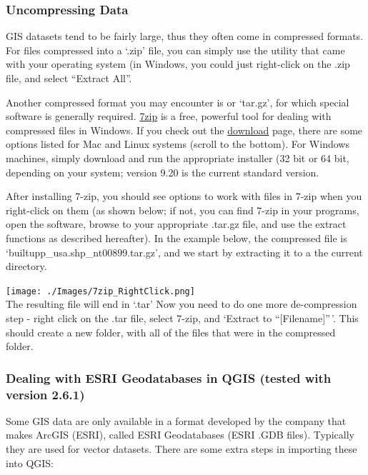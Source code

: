 \documentclass[12pt,]{article}
\begin{document}
\subsubsection{Uncompressing Data}\label{uncompressing-data}

GIS datasets tend to be fairly large, thus they often come in compressed
formats. For files compressed into a `.zip' file, you can simply use the
utility that came with your operating system (in Windows, you could just
right-click on the .zip file, and select ``Extract All''.

Another compressed format you may encounter is or `tar.gz', for which
special software is generally required.
\href{http://www.7-zip.org/}{7zip} is a free, powerful tool for dealing
with compressed files in Windows. If you check out the
\href{http://www.7-zip.org/download.html}{download} page, there are some
options listed for Mac and Linux systems (scroll to the bottom). For
Windows machines, simply download and run the appropriate installer (32
bit or 64 bit, depending on your system; version 9.20 is the current
standard version.

After installing 7-zip, you should see options to work with files in
7-zip when you right-click on them (as shown below; if not, you can find
7-zip in your programs, open the software, browse to your appropriate
.tar.gz file, and use the extract functions as described hereafter). In
the example below, the compressed file is
`builtupp\_usa.shp\_nt00899.tar.gz', and we start by extracting it to a
the current directory.

\texttt{[image: ./Images/7zip\_RightClick.png]}\\

The resulting file will end in `.tar' Now you need to do one more
de-compression step - right click on the .tar file, select 7-zip, and
`Extract to ``{[}Filename{]}''\,'. This should create a new folder, with
all of the files that were in the compressed folder.

\subsubsection{Dealing with ESRI Geodatabases in QGIS (tested with
version
2.6.1)}\label{dealing-with-esri-geodatabases-in-qgis-tested-with-version-2.6.1}

Some GIS data are only available in a format developed by the company
that makes ArcGIS (ESRI), called ESRI Geodatabases (ESRI .GDB files).
Typically they are used for vector datasets. There are some extra steps
in importing these into QGIS:
\end{document}

